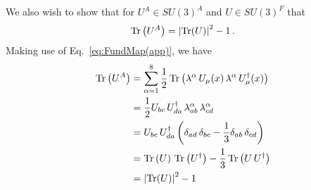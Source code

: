 We also wish to show that for $U^A\in SU(3)^A$ and $U\in SU(3)^F$ that
%
\begin{equation}
\operatorname{Tr}\left(U^A\right) = \left|\operatorname{Tr}(U)\right|^2 -1\, .
\end{equation}
%
Making use of Eq.~\ref{eq:FundMap(app)}, we have
\begin{align*}
\operatorname{Tr}\left(U^A\right) &= \sum_{\alpha=1}^8 \frac{1}{2}\operatorname{Tr}\left(\lambda^\alpha \, U_\mu(x) \, \lambda^\alpha \, U_\mu^\dagger(x)\right)\\
&= \frac{1}{2}U_{bc} \, U^\dagger_{da} \, \lambda_{ab}^\alpha \, \lambda_{cd}^\alpha\\
&= U_{bc} \, U^\dagger_{da} \left(\delta_{ad}\,\delta_{bc} - \frac{1}{3}\delta_{ab}\,\delta_{cd}\right)\\
&= \operatorname{Tr}\left(U\right) \, \operatorname{Tr}\left( U^\dagger \right) - \frac{1}{3}\operatorname{Tr}\left(U\, U^\dagger\right)\\
&= \left|\operatorname{Tr}(U)\right|^2 -1
\end{align*}

